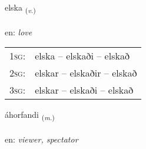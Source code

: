\documentclass[frontgrid, backgrid]{flacards}\usepackage[]{graphicx}\usepackage[]{color}
\begin{document}
{elska \small{\textsubscript{(\textit{v.})}} \\[1ex] %
\textphonetic{[ɛlska]} \\
en: \emph{love} \\  [2ex]
\renewcommand*{\arraystretch}{0.8}
\begin{tabular}{p{1cm}l}
\textsc{1sg}: & elska -- elskaði -- elskað \\ 
\textsc{2sg}: & elskar -- elskaðir -- elskað \\ 
\textsc{3sg}: & elskar -- elskaði -- elskað \\ 
\end{tabular}
}

\renewcommand{\flhead}{\vskip5pt \fboxsep=0pt {\small\bfseries\footnotesize Nafnorð | Noun}}
\renewcommand{\fcfoot}{\vskip5pt \fboxsep=0pt \hspace{2pt}{\small\bfseries\footnotesize 2K}}

\renewcommand{\blhead}{\vskip5pt {\small\bfseries\footnotesize Nafnorð | Noun }}
\renewcommand{\bcfoot}{\vskip5pt \hspace{2pt}{\small\bfseries\footnotesize 2K}}


{áhorfandi \small{\textsubscript{(\textit{m.})}} \\[1ex] %
\textphonetic{[auːhɔrvantɪ]} \\
en: \emph{viewer, spectator} \\  [2ex]
\renewcommand*{\arraystretch}{0.8}
}

\renewcommand{\flhead}{\vskip5pt \fboxsep=0pt {\small\bfseries\footnotesize Nafnorð | Noun}}
\renewcommand{\fcfoot}{\vskip5pt \fboxsep=0pt \hspace{2pt}{\small\bfseries\footnotesize 2K}}
\end{document}
